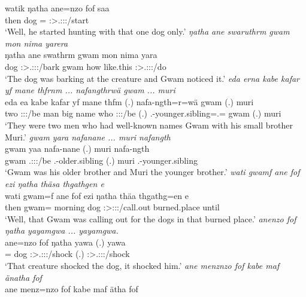 \begin{exe}
	\gll watik ŋatha ane=nzo fof saa\\ 
	then dog \Dem=\Only{} \Emph{} \Sg:\Sbj>\Tsg.\Masc:\Obj:\Pst:\Pfv/start\\
	\trans `Well, he started hunting with that one dog only.'
	\emph{ŋatha ane swaruthrm gwam mon nima yarera}\\
	\gll ŋatha ane swathrm gwam mon nima yara\\ 
	dog \Dem{} \Sg:\Sbj>\Tsg.\Masc:\Io:\Pst:\Dur/bark gwam how like.this \Sg:\Sbj>\Tsg.\Masc:\Io:\Pst:\Ipfv/do\\
	\trans `The dog was barking at the creature and Gwam noticed it.'
	\emph{eda erna kabe kafar yf mane thfrnm ... nafangthrwä gwam ... muri}\\
	\gll eda ea kabe kafar yf mane thfm (.) nafa-ngth=r=wä gwam (.) muri\\ 
	two \Stdu:\Sbj:\Pst:\Ipfv/be man big name who \Stdu:\Sbj:\Pst:\Dur/be (.) \Third.\Poss-younger.sibling=\Assoc.\Du=\Emph{} gwam (.) muri\\
	\trans `They were two men who had well-known names Gwam with his small brother Muri.'
	\emph{gwam yara nafanane ... muri nafangth}\\
	\gll gwam yaa nafa-nane (.) muri nafa-ngth\\ 
	gwam \Tsg.\Masc:\Sbj:\Pst:\Ipfv/be \Third.\Poss-older.sibling (.) muri \Third.\Poss-younger.sibling\\
	\trans `Gwam was his older brother and Muri the younger brother.'
	\emph{wati gwamf ane fof ezi ŋatha thäsa thgathgen e}\\
	\gll wati gwam=f ane fof ezi ŋatha thäa thgathg=en e\\ 
	then gwam=\Erg{} \Dem{} \Emph{} morning dog \Sg:\Sbj>\Stpl:\Obj:\Pst:\Pfv/call.out burned.place until\\
	\trans `Well, that Gwam was calling out for the dogs in that burned place.'
	\emph{anenzo fof ŋatha yayamgwa ... yayamgwa.}\\
	\gll ane=nzo fof ŋatha yawa (.) yawa\\ 
	\Dem=\Only{} \Emph{} dog \Sg:\Sbj>\Tsg.\Masc:\Obj:\Pst:\Ipfv/shock (.) \Sg:\Sbj>\Tsg.\Masc:\Obj:\Pst:\Ipfv/shock\\
	\trans `That creature shocked the dog, it shocked him.'
	\emph{ane menznzo fof kabe maf änatha fof}\\
	\gll ane menz=nzo fof kabe maf ätha fof\\ 

\end{exe}
